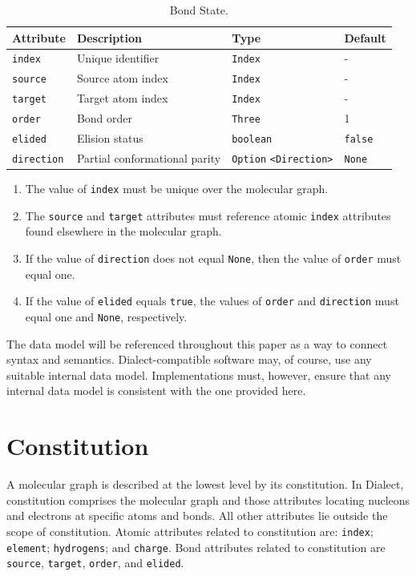 \documentclass{article}
\def\ttt{\texttt}
\begin{document}
\begin{table}
\caption{Bond State.}
\centering
\begin{tabular}{l L L l}
    \hline
    Attribute & Description & Type & Default \\
    \hline
    \ttt{index} & Unique identifier & \ttt{Index} & - \\
    \ttt{source} & Source atom index & \ttt{Index} & - \\
    \ttt{target} & Target atom index & \ttt{Index} & - \\
    \ttt{order} & Bond order & \ttt{Three} & 1 \\
    \ttt{elided} & Elision status & \ttt{boolean} & \ttt{false} \\
    \ttt{direction} & Partial conformational parity & \ttt{Option} \ttt{<Direction>} & \ttt{None} \\
    \hline
\end{tabular}
\label{table:bond-state}
\end{table}

\begin{enumerate}
    \item{The value of \ttt{index} must be unique over the molecular graph.}
    \item{The \ttt{source} and \ttt{target} attributes must reference atomic \ttt{index} attributes found elsewhere in the molecular graph.}
    \item{If the value of \ttt{direction} does not equal \ttt{None}, then the value of \ttt{order} must equal one.}
    \item{If the value of \ttt{elided} equals \ttt{true}, the values of \ttt{order} and \ttt{direction} must equal one and \ttt{None}, respectively.}
\end{enumerate}

The data model will be referenced throughout this paper as a way to connect syntax and semantics. Dialect-compatible software may, of course, use any suitable internal data model. Implementations must, however, ensure that any internal data model is consistent with the one provided here.

\section*{Constitution}

A molecular graph is described at the lowest level by its constitution. In Dialect, constitution comprises the molecular graph and those attributes locating nucleons and electrons at specific atoms and bonds. All other attributes lie outside the scope of constitution. Atomic attributes related to constitution are: \ttt{index}; \ttt{element}; \ttt{hydrogens}; and \ttt{charge}. Bond attributes related to constitution are \ttt{source}, \ttt{target}, \ttt{order}, and \ttt{elided}.
\end{document}
